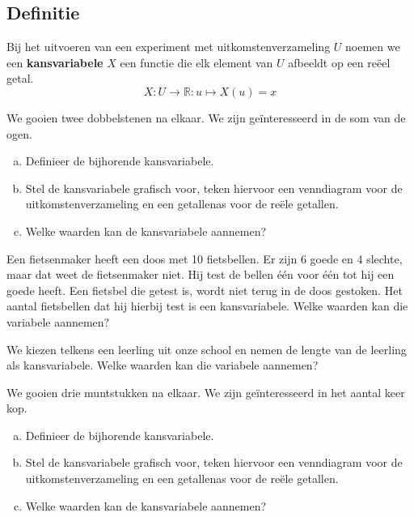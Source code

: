 \documentclass[a4paper,12pt, twoside]{article}
\begin{document}
\subsection{Definitie}

\begin{mdframed}
Bij het uitvoeren van een experiment met uitkomstenverzameling $U$ noemen we een {\bf kansvariabele} $X$ een functie die elk element van $U$ afbeeldt op een reëel getal.
$$X:U\to\mathbb{R}:u\mapsto X(u)=x$$
\end{mdframed}

\begin{oefening}
We gooien twee dobbelstenen na elkaar. We zijn geïnteresseerd in de som van de ogen.
\begin{enumerate}[(a)]
  \item Definieer de bijhorende kansvariabele.
  \item Stel de kansvariabele grafisch voor, teken hiervoor een venndiagram voor de uitkomstenverzameling en een getallenas voor de reële getallen.
  \item Welke waarden kan de kansvariabele aannemen?
\end{enumerate}
\end{oefening}

\begin{oefening}
Een fietsenmaker heeft een doos met 10 fietsbellen. Er zijn 6 goede en 4 slechte, maar dat weet de fietsenmaker niet. Hij test de bellen één voor één tot hij een goede heeft. Een fietsbel die getest is, wordt niet terug in de doos gestoken. Het aantal fietsbellen dat hij hierbij test is een kansvariabele.
Welke waarden kan die variabele aannemen?
\end{oefening}

\begin{oefening}
We kiezen telkens een leerling uit onze school en nemen de lengte van de leerling als kansvariabele. Welke waarden kan die variabele aannemen?
\end{oefening}

\begin{oefening}
We gooien drie muntstukken na elkaar. We zijn geïnteresseerd in het aantal keer kop.
\begin{enumerate}[(a)]
  \item Definieer de bijhorende kansvariabele.
  \item Stel de kansvariabele grafisch voor, teken hiervoor een venndiagram voor de uitkomstenverzameling en een getallenas voor de reële getallen.
  \item Welke waarden kan de kansvariabele aannemen?
\end{enumerate}
\end{oefening}
\end{document}
